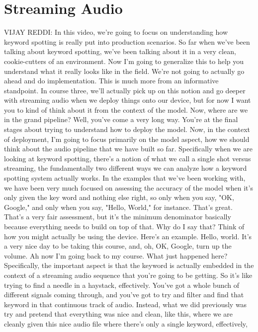 \section{Streaming Audio}

VIJAY REDDI: In this video, we're going to focus
on understanding how keyword spotting is really put into production scenarios.
So far when we've been talking about keyword spotting,
we've been talking about it in a very clean, cookie-cutters
of an environment.
Now I'm going to generalize this to help you understand what it really
looks like in the field.
We're not going to actually go ahead and do implementation.
This is much more from an informative standpoint.
In course three, we'll actually pick up on this notion
and go deeper with streaming audio when we deploy things onto our device,
but for now I want you to kind of think about it from the context of the model.
Now, where are we in the grand pipeline?
Well, you've come a very long way.
You're at the final stages about trying to understand how to deploy the model.
Now, in the context of deployment, I'm going
to focus primarily on the model aspect, how
we should think about the audio pipeline that we have built so far.
Specifically when we are looking at keyword spotting,
there's a notion of what we call a single shot versus streaming,
the fundamentally two different ways we can analyze how a keyword spotting
system actually works.
In the examples that we've been working with,
we have been very much focused on assessing
the accuracy of the model when it's only given the key word and nothing
else right, so only when you say, "OK, Google," and only when you say,
"Hello, World," for instance.
That's great.
That's a very fair assessment, but it's the minimum denominator basically
because everything needs to build on top of that.
Why do I say that?
Think of how you might actually be using the device.
Here's an example.
Hello, world.
It's a very nice day to be taking this course, and, oh, OK, Google,
turn up the volume.
Ah now I'm going back to my course.
What just happened here?
Specifically, the important aspect is that the keyword is actually
embedded in the context of a streaming audio sequence
that you're going to be getting.
So it's like trying to find a needle in a haystack, effectively.
You've got a whole bunch of different signals coming through,
and you've got to try and filter and find that keyword
in that continuous track of audio.
Instead, what we did previously was try and pretend
that everything was nice and clean, like this, where we are cleanly
given this nice audio file where there's only a single keyword, effectively,
